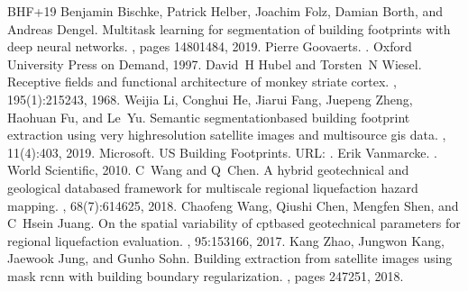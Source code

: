 \documentclass[letterpaper,10pt,english]{sphinxmanual}
\begin{document}
\begin{sphinxthebibliography}{BHF+19}
\sphinxAtStartPar
Benjamin Bischke, Patrick Helber, Joachim Folz, Damian Borth, and Andreas Dengel. Multi\sphinxhyphen{}task learning for segmentation of building footprints with deep neural networks. , pages 1480\textendash{}1484, 2019.
\sphinxAtStartPar
Pierre Goovaerts. . Oxford University Press on Demand, 1997.
\sphinxAtStartPar
David H Hubel and Torsten N Wiesel. Receptive fields and functional architecture of monkey striate cortex. , 195(1):215\textendash{}243, 1968.
\sphinxAtStartPar
Weijia Li, Conghui He, Jiarui Fang, Juepeng Zheng, Haohuan Fu, and Le Yu. Semantic segmentation\sphinxhyphen{}based building footprint extraction using very high\sphinxhyphen{}resolution satellite images and multi\sphinxhyphen{}source gis data. , 11(4):403, 2019.
\sphinxAtStartPar
Microsoft. US Building Footprints. URL: .
\sphinxAtStartPar
Erik Vanmarcke. . World Scientific, 2010.
\sphinxAtStartPar
C Wang and Q Chen. A hybrid geotechnical and geological data\sphinxhyphen{}based framework for multiscale regional liquefaction hazard mapping. , 68(7):614\textendash{}625, 2018.
\sphinxAtStartPar
Chaofeng Wang, Qiushi Chen, Mengfen Shen, and C Hsein Juang. On the spatial variability of cpt\sphinxhyphen{}based geotechnical parameters for regional liquefaction evaluation. , 95:153\textendash{}166, 2017.
\sphinxAtStartPar
Kang Zhao, Jungwon Kang, Jaewook Jung, and Gunho Sohn. Building extraction from satellite images using mask r\sphinxhyphen{}cnn with building boundary regularization. , pages 247\textendash{}251, 2018.

\end{sphinxthebibliography}
\end{document}
